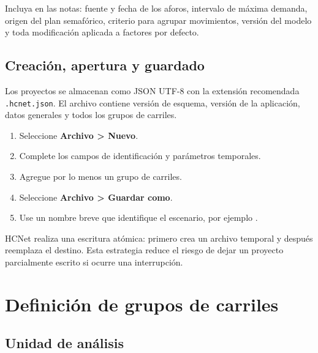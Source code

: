 \documentclass[11pt,letterpaper,oneside,openany]{report}
\begin{document}
\begin{tipbox}
Incluya en las notas: fuente y fecha de los aforos, intervalo de máxima demanda,
origen del plan semafórico, criterio para agrupar movimientos, versión del modelo
y toda modificación aplicada a factores por defecto.
\end{tipbox}

\section{Creación, apertura y guardado}

Los proyectos se almacenan como JSON UTF-8 con la extensión recomendada
\texttt{.hcnet.json}. El archivo contiene versión de esquema, versión de la
aplicación, datos generales y todos los grupos de carriles.

\begin{procedurebox}
\begin{enumerate}
  \item Seleccione \textbf{Archivo > Nuevo}.
  \item Complete los campos de identificación y parámetros temporales.
  \item Agregue por lo menos un grupo de carriles.
  \item Seleccione \textbf{Archivo > Guardar como}.
  \item Use un nombre breve que identifique el escenario, por ejemplo
        .
\end{enumerate}
\end{procedurebox}

HCNet realiza una escritura atómica: primero crea un archivo temporal y después
reemplaza el destino. Esta estrategia reduce el riesgo de dejar un proyecto
parcialmente escrito si ocurre una interrupción.

\chapter{Definición de grupos de carriles}

\section{Unidad de análisis}
\end{document}
